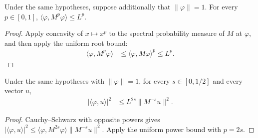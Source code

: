 \begin{theorem}
    \label{thm:mean_tree_uniform_power_expectation}
    \leanok
    Under the same hypotheses, suppose additionally that
    $\|\varphi\|=1$. For every $p\in[0,1]$,
    $\langle\varphi,M^p\varphi\rangle\le L^p$.
\end{theorem}
\begin{proof}
    \leanok
    Apply concavity of $x\mapsto x^p$ to the spectral probability measure
    of $M$ at $\varphi$, and then apply the uniform root bound:
    \begin{align*}
        \langle\varphi,M^p\varphi\rangle
        &\le\langle\varphi,M\varphi\rangle^p\le L^p.
    \end{align*}
\end{proof}

\begin{theorem}
    \label{thm:mean_tree_uniform_inverse_overlap}
    \leanok
    Under the same hypotheses with $\|\varphi\|=1$, for every
    $s\in[0,1/2]$ and every vector $u$,
    \begin{align*}
        |\langle\varphi,u\rangle|^2
        &\le L^{2s}\|M^{-s}u\|^2.
    \end{align*}
\end{theorem}
\begin{proof}
    \leanok
    Cauchy--Schwarz with opposite powers gives
    $|\langle\varphi,u\rangle|^2
      \le\langle\varphi,M^{2s}\varphi\rangle\|M^{-s}u\|^2$.
    Apply the uniform power bound with $p=2s$.
\end{proof}

